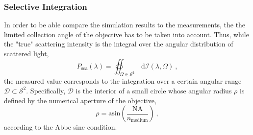 \documentclass[10pt]{article}
\begin{document}
\subsubsection*{Selective Integration}

In order to be able compare the simulation results to the measurements, the the limited collection angle of the objective has to be taken into account. 
Thus, while the "true" scattering intensity is the integral over the angular distribution of scattered light, 
$$
    P_\mathrm{sca}(\lambda) = \oiint_{\Omega \in \mathcal{S}^2} \,\mathrm{d}\mathcal{I}(\lambda, \Omega) \ , %
$$
the measured value corresponds to the integration over a certain angular range $\mathcal{D} \subset \mathcal{S}^2$. 
Specifically, $\mathcal{D}$ is the interior of a small circle whose angular radius $\rho$ is defined by the numerical aperture of the objective, 
$$
    \rho = \mathrm{asin}\!\left( \frac{\mathrm{NA}}{n_\mathrm{medium}} \right) \ ,
$$
according to the Abbe sine condition. \cite{MONA-BFP-photonic-crystals,MONA-BFP-photonic-stop-bands}

%
%



\end{document}
